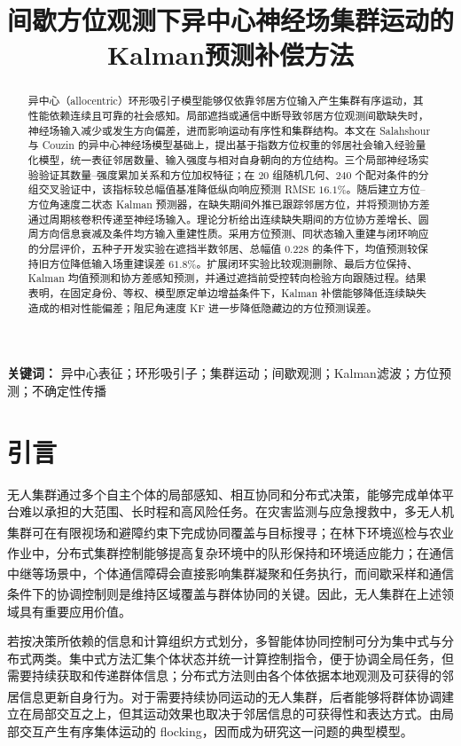 \documentclass[UTF8,fontset=windows,11pt]{ctexart}
\title{\bfseries 间歇方位观测下异中心神经场集群运动的\newline Kalman预测补偿方法}
\author{}
\date{}
\newcommand{\upcite}[1]{\textsuperscript{\cite{#1}}}
\begin{document}
\maketitle

\begin{abstract}
异中心（allocentric）环形吸引子模型能够仅依靠邻居方位输入产生集群有序运动，其性能依赖连续且可靠的社会感知。局部遮挡或通信中断导致邻居方位观测间歇缺失时，神经场输入减少或发生方向偏差，进而影响运动有序性和集群结构。本文在 Salahshour 与 Couzin 的异中心神经场模型基础上，提出基于指数方位权重的邻居社会输入经验量化模型，统一表征邻居数量、输入强度与相对自身朝向的方位结构。三个局部神经场实验验证其数量--强度累加关系和方位加权特征；在 $20$ 组随机几何、$240$ 个配对条件的分组交叉验证中，该指标较总幅值基准降低纵向响应预测 RMSE $16.1\%$。随后建立方位--方位角速度二状态 Kalman 预测器，在缺失期间外推已跟踪邻居方位，并将预测协方差通过周期核卷积传递至神经场输入。理论分析给出连续缺失期间的方位协方差增长、圆周方向信息衰减及条件均方输入重建性质。采用方位预测、同状态输入重建与闭环响应的分层评价，五种子开发实验在遮挡半数邻居、总幅值 $0.228$ 的条件下，均值预测较保持旧方位降低输入场重建误差 $61.8\%$。扩展闭环实验比较观测删除、最后方位保持、Kalman 均值预测和协方差感知预测，并通过遮挡前受控转向检验方向跟随过程。结果表明，在固定身份、等权、模型原定单边增益条件下，Kalman 补偿能够降低连续缺失造成的相对性能偏差；阻尼角速度 KF 进一步降低隐藏边的方位预测误差。
\end{abstract}

\noindent\textbf{关键词：} 异中心表征；环形吸引子；集群运动；间歇观测；Kalman滤波；方位预测；不确定性传播

\section{引言}

无人集群通过多个自主个体的局部感知、相互协同和分布式决策，能够完成单体平台难以承担的大范围、长时程和高风险任务。在灾害监测与应急搜救中，多无人机集群可在有限视场和避障约束下完成协同覆盖与目标搜寻\upcite{Bai2024}；在林下环境巡检与农业作业中，分布式集群控制能够提高复杂环境中的队形保持和环境适应能力\upcite{Boldrer2026}；在通信中继等场景中，个体通信障碍会直接影响集群凝聚和任务执行\upcite{LiFlocking2024}，而间歇采样和通信条件下的协调控制则是维持区域覆盖与群体协同的关键\upcite{Ge2025Coordination}。因此，无人集群在上述领域具有重要应用价值。

若按决策所依赖的信息和计算组织方式划分，多智能体协同控制可分为集中式与分布式两类。集中式方法汇集个体状态并统一计算控制指令，便于协调全局任务，但需要持续获取和传递群体信息；分布式方法则由各个体依据本地观测及可获得的邻居信息更新自身行为\upcite{OlfatiSaber2006}。对于需要持续协同运动的无人集群，后者能够将群体协调建立在局部交互之上，但其运动效果也取决于邻居信息的可获得性和表达方式。由局部交互产生有序集体运动的 flocking，因而成为研究这一问题的典型模型。
\end{document}

